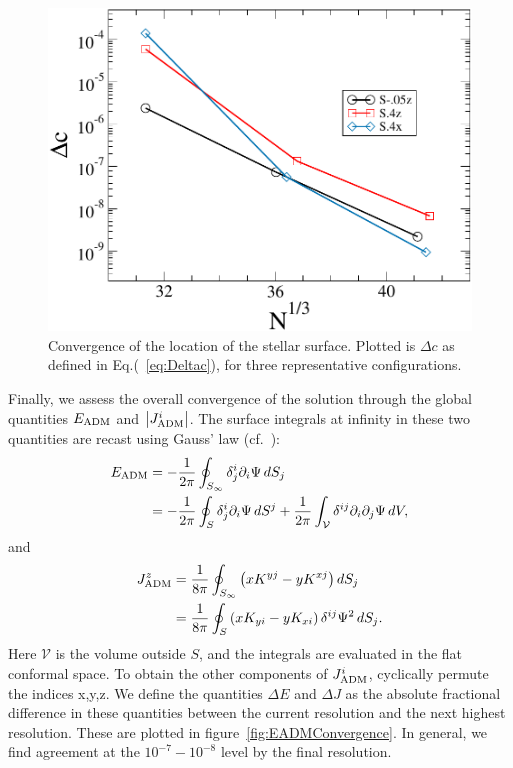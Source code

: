 \begin{figure}
\includegraphics[width=0.95\columnwidth]{chap2/ClmDif}
\caption[Convergence of the location of the stellar surface.]{{\label{fig:ClmDif} Convergence of the location of the stellar surface}.
  Plotted is $\Delta c$ as defined in Eq.(~\ref{eq:Deltac}), for three representative configurations.}
\end{figure}

Finally, we assess the overall convergence of the solution through
the global quantities $E_{\rm ADM}$ and $\left|J^i_{\rm ADM}\right|$.
The surface integrals at infinity in these two quantities are recast using Gauss' law (cf.~\citep{FoucartEtAl:2008}):
\begin{align}
E_{\rm ADM} &= -\frac{1}{2\pi}\oint_{S_{\infty}}\delta^i_j\partial_i\Psi\, dS_j\nonumber \\
&= -\frac{1}{2\pi}\oint_{S}\delta^i_j \partial_i\Psi\, dS^j  +\frac{1}{2\pi}\int_{\mathcal{V}}\delta^{ij}\partial_i\partial_j\Psi\,dV,
\end{align}
and
\begin{align}
J^{z}_{\rm ADM} 
& = \frac{1}{8\pi}\oint_{S_{\infty}}\left(xK^{yj}-y K^{xj}\right)dS_j\nonumber\\
& = \frac{1}{8\pi}\oint_{S}\left(xK_{yi}-yK_{xi}\right)\delta^{ij}\Psi^2\,dS_j.
\end{align}
Here $\mathcal V$ is the volume outside $S$, and the integrals are evaluated in the flat conformal space. To obtain the other components of $J_{\rm ADM}^i$, cyclically permute the indices x,y,z.
 We define the quantities $\Delta E$ and $\Delta J$ as the absolute fractional difference in these quantities between the current resolution and the next highest resolution. These are plotted in figure~\ref{fig:EADMConvergence}.  
In general, we find
agreement at the $10^{-7}-10^{-8}$ level by the final
resolution.


